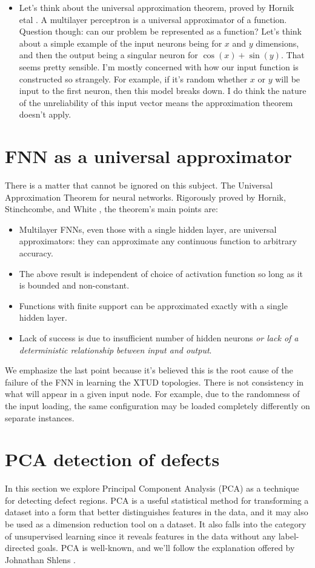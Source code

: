 \begin{itemize}
	\item Let's think about the universal approximation theorem, proved by Hornik etal \cite{hornik1989multilayer}. A multilayer perceptron is a universal approximator of a function. Question though: can our problem be represented as a function? Let's think about a simple example of the input neurons being for $x$ and $y$ dimensions, and then the output being a singular neuron for $\cos(x)+\sin(y)$. That seems pretty sensible. I'm mostly concerned with how our input function is constructed so strangely. For example, if it's random whether $x$ or $y$ will be input to the first neuron, then this model breaks down.
	I do think the nature of the unreliability of this input vector means the approximation theorem doesn't apply. 
\end{itemize}

\section{FNN as a universal approximator}
There is a matter that cannot be ignored on this subject. The Universal Approximation Theorem for neural networks. Rigorously proved by Hornik, Stinchcombe, and White \cite{hornik1989multilayer}, the theorem's main points are:
\begin{itemize}
	\item Multilayer FNNs, even those with a single hidden layer, are universal approximators: they can approximate any continuous function to arbitrary accuracy.
	\item The above result is independent of choice of activation function so long as it is bounded and non-constant.
	\item Functions with finite support can be approximated exactly with a single hidden layer.
	\item Lack of success is due to insufficient number of hidden neurons \emph{or lack of a deterministic relationship between input and output}.
\end{itemize}
We emphasize the last point because it's believed this is the root cause of the failure of the FNN in learning the XTUD topologies. There is not consistency in what will appear in a given input node. For example, due to the randomness of the input loading, the same configuration may be loaded completely differently on separate instances.


\section{PCA detection of defects}
In this section we explore Principal Component Analysis (PCA) as a technique for detecting defect regions. PCA is a useful statistical method for transforming a dataset into a form that better distinguishes features in the data, and it may also be used as a dimension reduction tool on a dataset. It also falls into the category of unsupervised learning since it reveals features in the data without any label-directed goals. PCA is well-known, and we'll follow the explanation offered by Johnathan Shlens \cite{shlens2014pca}.

